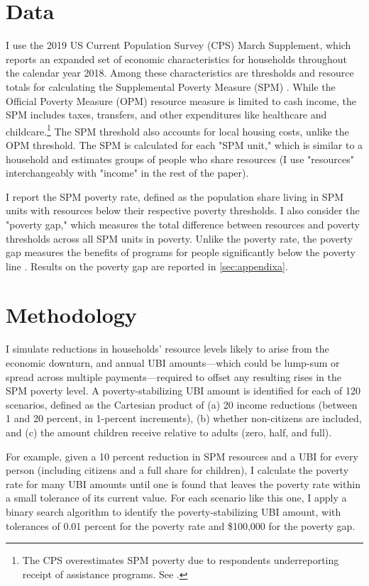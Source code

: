 \documentclass[12pt]{article}
\begin{document}
\section{Data} \label{sec:data}

I use the 2019 US Current Population Survey (CPS) March Supplement, which reports an expanded set of economic characteristics for households throughout the calendar year 2018. Among these characteristics are thresholds and resource totals for calculating the Supplemental Poverty Measure (SPM) \cite{spm}. While the Official Poverty Measure (OPM) resource measure is limited to cash income, the SPM includes taxes, transfers, and other expenditures like healthcare and childcare.\footnote{The CPS overestimates SPM poverty due to respondents underreporting receipt of assistance programs. See .} The SPM threshold also accounts for local housing costs, unlike the OPM threshold. The SPM is calculated for each "SPM unit," which is similar to a household and estimates groups of people who share resources (I use "resources" interchangeably with "income" in the rest of the paper).

I report the SPM poverty rate, defined as the population share living in SPM units with resources below their respective poverty thresholds. I also consider the "poverty gap," which measures the total difference between resources and poverty thresholds across all SPM units in poverty. Unlike the poverty rate, the poverty gap measures the benefits of programs for people significantly below the poverty line \cite{bruenig}. Results on the poverty gap are reported in \autoref{sec:appendixa}.


\section{Methodology} \label{sec:methodology}

I simulate reductions in households' resource levels likely to arise from the economic downturn, and annual UBI amounts---which could be lump-sum or spread across multiple payments---required to offset any resulting rises in the SPM poverty level. A poverty-stabilizing UBI amount is identified for each of 120 scenarios, defined as the Cartesian product of (a) 20 income reductions (between 1 and 20 percent, in 1-percent increments), (b) whether non-citizens are included, and (c) the amount children receive relative to adults (zero, half, and full).

For example, given a 10 percent reduction in SPM resources and a UBI for every person (including citizens and a full share for children), I calculate the poverty rate for many UBI amounts until one is found that leaves the poverty rate within a small tolerance of its current value. For each scenario like this one, I apply a binary search algorithm \cite{binary_search} to identify the poverty-stabilizing UBI amount, with tolerances of 0.01 percent for the poverty rate and \$100,000 for the poverty gap.
\end{document}

